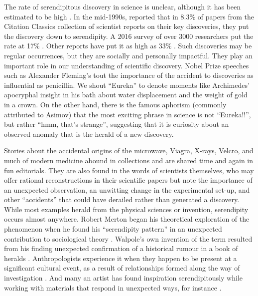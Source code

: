 \documentclass[authordate, empirical]{jote-new-article}
\begin{document}
	The rate of serendipitous discovery in science is unclear, although it has been estimated to be high \parencites{Thagard2012}. In the mid-1990s, \textcites{Campanario1996} reported that in 8.3\% of papers from the Citation Classics collection of scientist reports on their key discoveries, they put the discovery down to serendipity. A 2016 survey of over 3000 researchers put the rate at 17\% \parencites{Willems2022}. Other reports have put it as high as 33\% \parencites{Hargrave-Thomas2012}. Such discoveries may be regular occurrences, but they are socially and personally impactful. They play an important role in our understanding of scientific discovery. Nobel Prize speeches such as Alexander Fleming's tout the importance of the accident to discoveries as influential as penicillin. We shout “Eureka” to denote moments like Archimedes' apocryphal insight in his bath about water displacement and the weight of gold in a crown. On the other hand, there is the famous aphorism (commonly attributed to Asimov) that the most exciting phrase in science is not “Eureka!!”, but rather “hmm, that's strange”, suggesting that it is curiosity about an observed anomaly that is the herald of a new discovery.



	Stories about the accidental origins of the microwave, Viagra, X-rays, Velcro, and much of modern medicine abound in collections and are shared time and again in fun editorials. They are also found in the words of scientists themselves, who may offer rational reconstructions in their scientific papers but note the importance of an unexpected observation, an unwitting change in the experimental set-up, and other “accidents” that could have derailed rather than generated a discovery. While most examples herald from the physical sciences or invention, serendipity occurs almost anywhere. Robert Merton began his theoretical exploration of the phenomenon when he found his “serendipity pattern” in an unexpected contribution to sociological theory \parencites{Merton1948}. Walpole's own invention of the term resulted from his finding unexpected confirmation of a historical rumour in a book of heralds \parencites{Walpole1754}. Anthropologists experience it when they happen to be present at a significant cultural event, as a result of relationships formed along the way of investigation \parencites[e.g.,][]{Fine2006}. And many an artist has found inspiration serendipitously while working with materials that respond in unexpected ways, for instance \parencites[see][for examples]{Ross2022}.
\end{document}
